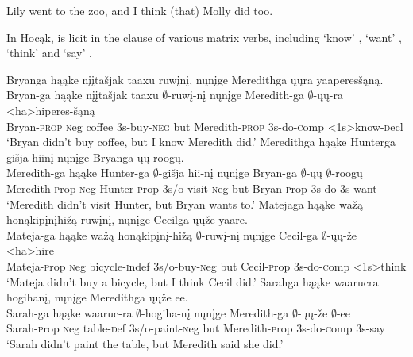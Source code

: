 \documentclass[output=paper]{LSP/langsci}
\begin{document}
 
\ea\label{ex:johnson:37}
\ea\label{ex:johnson:37a} 
Lily went to the zoo, and I think (that) Molly did too.
\label{ex:johnson:37b}
\label{ex:johnson:3c}
\z
\z

In Hocąk,  is licit in the  clause of various matrix verbs, including `know' , `want' , `think'  and `say' .


 
\ea
\ea\label{ex:johnson:38a} 
\glll Bryanga hąąke {nįįtašjak taaxu} ruwįnį, nųnįge Meredithga ųųra yaaperesšąną.\\
Bryan-ga hąąke {nįįtašjak taaxu} $\emptyset$-ruwį-nį nųnįge Meredith-ga $\emptyset$-ųų-ra <ha>hiperes-šąną\\
Bryan-\textsc{prop} {\textsc neg} coffee {\textsc 3s}-buy-\textsc{neg} but Meredith-\textsc{prop} {\textsc 3s}-do-{\textsc comp} <{\textsc 1s}>know-{\textsc decl}\\
\trans `Bryan didn't buy coffee, but I know Meredith did.'
\ex\label{ex:johnson:38b}
\glll Meredithga hąąke Hunterga {gišja hiinį} nųnįge Bryanga ųų roogų.\\
Meredith-ga hąąke Hunter-ga $\emptyset$-{gišja hii-nį} nųnįge Bryan-ga $\emptyset$-ųų $\emptyset$-roogų\\
Meredith-{\textsc prop} {\textsc neg} Hunter-{\textsc prop} {\textsc 3s/o}-visit-{\textsc neg} but Bryan-{\textsc prop} {\textsc 3s}-do {\textsc 3s}-want\\
\trans `Meredith didn't visit Hunter, but Bryan wants to.'
\ex\label{ex:johnson:38c}
\glll Matejaga hąąke {wažą honąkipįnįhižą} ruwįnį, nųnįge Cecilga ųųže yaare.\\
Mateja-ga hąąke {wažą honąkipįnį-hižą} $\emptyset$-ruwį-nį nųnįge Cecil-ga $\emptyset$-ųų-že <ha>hire\\
Mateja-{\textsc prop} {\textsc neg} bicycle-{\textsc indef} {\textsc 3s/o}-buy-{\textsc neg} but Cecil-{\textsc prop} {\textsc 3s}-do-{\textsc comp} <{\textsc 1s}>think\\
\trans `Mateja didn't buy a bicycle, but I think Cecil did.'
\ex\label{ex:johnson:38d}
\glll Sarahga hąąke waarucra hogihanį, nųnįge Meredithga ųųže ee.\\
Sarah-ga hąąke waaruc-ra $\emptyset$-hogiha-nį nųnįge Meredith-ga $\emptyset$-ųų-že $\emptyset$-ee\\
Sarah-{\textsc prop} {\textsc neg} table-{\textsc def} {\textsc 3s/o}-paint-{\textsc neg} but Meredith-{\textsc prop} {\textsc 3s}-do-{\textsc comp} {\textsc 3s}-say\\
\trans `Sarah didn't paint the table, but Meredith said she did.'
\z
\z
\end{document}
